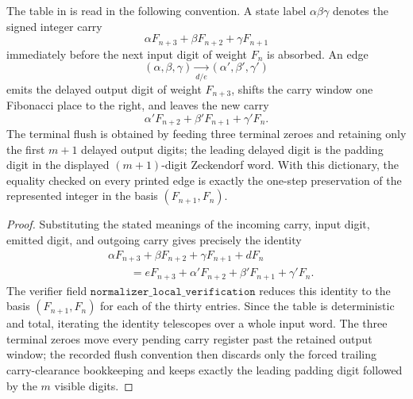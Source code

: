 \begin{lemma}
\label{lem:normalizer-convention-dictionary}
The table in  is read in the
following convention.  A state label \(\alpha\beta\gamma\) denotes the signed
integer carry
\[
  \alpha F_{n+3}+\beta F_{n+2}+\gamma F_{n+1}
\]
immediately before the next input digit of weight \(F_n\) is absorbed.  An
edge
\[
  (\alpha,\beta,\gamma)\xrightarrow[d/e]{}
  (\alpha',\beta',\gamma')
\]
emits the delayed output digit of weight \(F_{n+3}\), shifts the carry window
one Fibonacci place to the right, and leaves the new carry
\[
  \alpha'F_{n+2}+\beta'F_{n+1}+\gamma'F_n .
\]
The terminal flush is obtained by feeding three terminal zeroes and retaining
only the first \(m+1\) delayed output digits; the leading delayed digit is the
padding digit in the displayed \((m+1)\)-digit Zeckendorf word.  With this
dictionary, the equality checked on every printed edge is exactly the
one-step preservation of the represented integer in the basis
\((F_{n+1},F_n)\).
\end{lemma}

\begin{proof}
Substituting the stated meanings of the incoming carry, input digit, emitted
digit, and outgoing carry gives precisely the identity
\[
  \begin{aligned}
  &\alpha F_{n+3}+\beta F_{n+2}+\gamma F_{n+1}+dF_n\\
  &\qquad =
  eF_{n+3}+\alpha'F_{n+2}+\beta'F_{n+1}+\gamma'F_n .
  \end{aligned}
\]
The verifier field \(\texttt{normalizer\_local\_verification}\) reduces this
identity to the basis \((F_{n+1},F_n)\) for each of the thirty entries.  Since
the table is deterministic and total, iterating the identity telescopes over a
whole input word.  The three terminal zeroes move every pending carry register
past the retained output window; the recorded flush convention then discards
only the forced trailing carry-clearance bookkeeping and keeps exactly the
leading padding digit followed by the \(m\) visible digits.
\end{proof}

